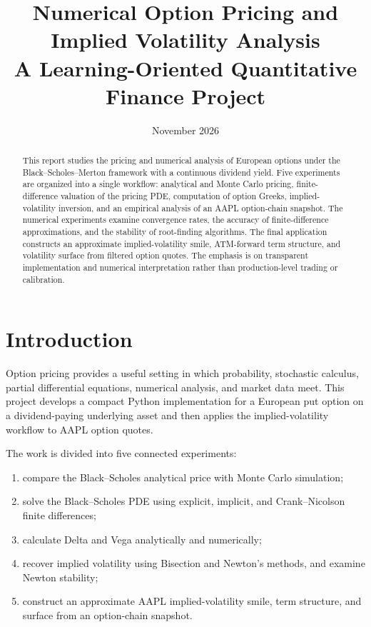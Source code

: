 \documentclass[11pt,a4paper]{article}
\title{\vspace{-1.0cm}\textbf{Numerical Option Pricing and\\Implied Volatility Analysis}\\[5pt]
\large A Learning-Oriented Quantitative Finance Project}
\author{}
\date{November 2026}
\begin{document}
\maketitle
\vspace{-0.8cm}

\begin{abstract}
This report studies the pricing and numerical analysis of European options under the Black--Scholes--Merton framework with a continuous dividend yield. Five experiments are organized into a single workflow: analytical and Monte Carlo pricing, finite-difference valuation of the pricing PDE, computation of option Greeks, implied-volatility inversion, and an empirical analysis of an AAPL option-chain snapshot. The numerical experiments examine convergence rates, the accuracy of finite-difference approximations, and the stability of root-finding algorithms. The final application constructs an approximate implied-volatility smile, ATM-forward term structure, and volatility surface from filtered option quotes. The emphasis is on transparent implementation and numerical interpretation rather than production-level trading or calibration.
\end{abstract}

\section{Introduction}

Option pricing provides a useful setting in which probability, stochastic calculus, partial differential equations, numerical analysis, and market data meet. This project develops a compact Python implementation for a European put option on a dividend-paying underlying asset and then applies the implied-volatility workflow to AAPL option quotes.

The work is divided into five connected experiments:
\begin{enumerate}
  \item compare the Black--Scholes analytical price with Monte Carlo simulation;
  \item solve the Black--Scholes PDE using explicit, implicit, and Crank--Nicolson finite differences;
  \item calculate Delta and Vega analytically and numerically;
  \item recover implied volatility using Bisection and Newton's methods, and examine Newton stability;
  \item construct an approximate AAPL implied-volatility smile, term structure, and surface from an option-chain snapshot.
\end{enumerate}
\end{document}
